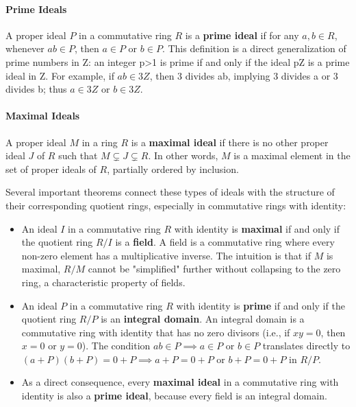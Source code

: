 \documentclass[12pt]{article}
\theoremstyle{definition}
\numberwithin{equation}{subsection}
\begin{document}
\paragraph{Prime Ideals} 

A proper ideal $P$ in a commutative ring $R$ is a \textbf{prime ideal} if for any $a,b \in R$, whenever $ab \in P$, then $a \in P$ or $b \in P$. This definition is a direct generalization of prime numbers in Z: an integer p>1 is prime if and only if the ideal pZ is a prime ideal in Z. For example, if $ab \in 3Z$, then 3 divides ab, implying 3 divides a or 3 divides b; thus $a \in 3Z$ or $b \in 3Z$.   

\paragraph{Maximal Ideals} 

A proper ideal $M$ in a ring $R$ is a \textbf{maximal ideal} if there is no other proper ideal $J$ of $R$ such that $M \subsetneq J \subsetneq R$. In other words, $M$ is a maximal element in the set of proper ideals of $R$, partially ordered by inclusion.   

Several important theorems connect these types of ideals with the structure of their corresponding quotient rings, especially in commutative rings with identity:
\begin{itemize}
\item An ideal $I$ in a commutative ring $R$ with identity is \textbf{maximal} if and only if the quotient ring $R/I$ is a \textbf{field}. A field is a commutative ring where every non-zero element has a multiplicative inverse. The intuition is that if $M$ is maximal, $R/M$ cannot be "simplified" further without collapsing to the zero ring, a characteristic property of fields.
\item An ideal $P$ in a commutative ring $R$ with identity is \textbf{prime} if and only if the quotient ring $R/P$ is an \textbf{integral domain}. An integral domain is a commutative ring with identity that has no zero divisors (i.e., if $xy=0$, then $x=0$ or $y=0$). The condition $ab \in P \implies a \in P$ or $b \in P$ translates directly to $(a+P)(b+P)=0+P \implies a+P=0+P$ or $b+P=0+P$ in $R/P$.
\item As a direct consequence, every \textbf{maximal ideal} in a commutative ring with identity is also a \textbf{prime ideal}, because every field is an integral domain.
\end{itemize}   
\end{document}
